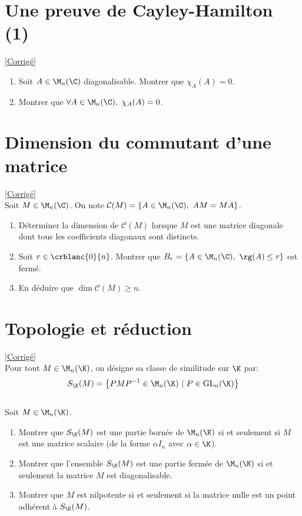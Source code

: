 \documentclass{book}
\begin{document}
\section{Une preuve de Cayley-Hamilton (1) }
\label{Une preuve de Cayley-Hamilton (1)}
\textcolor{blue}{\hyperref[sec:une-preuve-de-cayley-hamilton-1-etoile2]{[Corrigé]}}\\
\begin{enumerate}[leftmargin=*]
	\item Soit $A\in \M_n(\C)$ diagonalisable. Montrer que $\chi_A(A)=0$.
	\item Montrer que $\forall A\in \M_n(\C),\ \chi_A(A)=0$.
\end{enumerate}

\section{Dimension du commutant d'une matrice}
\label{Dimension du commutant d'une matrice}
\textcolor{blue}{\hyperref[sec:dimension-du-commutant-dune-matrice]{[Corrigé]}}\\
Soit $M\in \M_n(\C)$. On note $\mathcal C(M)=\{A\in \M_n(\C),\ AM=MA\}$.
\begin{enumerate}
	\item Déterminer la dimension de $\mathcal C(M)$ lorsque $M$ est une matrice diagonale dont tous les coefficients diagonaux sont distincts.
	\item Soit $r\in \crblanc{0}{n}$. Montrer que $B_r=\{A\in \M_n(\C),\ \rg(A)\leq r\}$ est fermé.
	\item En déduire que $\dim\mathcal C(M)\geq n$.
\end{enumerate}

\section{Topologie et réduction}
\label{Topologie et réduction}
\textcolor{blue}{\hyperref[sec:topologie-et-reduction]{[Corrigé]}}\\
Pour tout $M\in\M_n(\K)$, on désigne sa classe de similitude sur $\K$ par: $$S_{\K}(M)=\left\{PMP^{-1}\in\M_n(\K) \ | \ P\in \text{GL}_n(\K)\right\}$$
\\ Soit $M\in\M_n(\K)$.
\begin{enumerate}
	\item Montrer que $S_\K(M)$ est une partie bornée de $\M_n(\K)$ si et seulement si $M$ est une matrice scalaire (de la forme $\alpha I_n$ avec $\alpha\in \K$).
	\item Montrer que l'ensemble $S_\K(M)$ est une partie fermée de $\M_n(\K)$ si et seulement la matrice $M$ est diagonalisable.
	\item Montrer que $M$ est nilpotente si et seulement si la matrice nulle est un point adhérent à $S_\K(M)$.
\end{enumerate}
\end{document}
